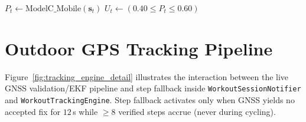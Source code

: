 \begin{algorithm}[htbp]
$P_t \leftarrow \text{ModelC\_Mobile}(\mathbf{s}_t)$\;
$U_t \leftarrow (0.40 \le P_t \le 0.60)$\;
\;
\caption{Adaptive Transition Engine Debouncing (\texttt{IndoorOutdoorTransitionEngine})}
\label{alg:transition_engine}
\end{algorithm}

\section{Outdoor GPS Tracking Pipeline}
\label{sec:gps_pipeline_design}
Figure~\ref{fig:tracking_engine_detail} illustrates the interaction between the live GNSS validation/EKF pipeline and step fallback inside \texttt{WorkoutSessionNotifier} and \texttt{WorkoutTrackingEngine}. Step fallback activates only when GNSS yields no accepted fix for $12$\,s while $\ge 8$ verified steps accrue (never during cycling).

